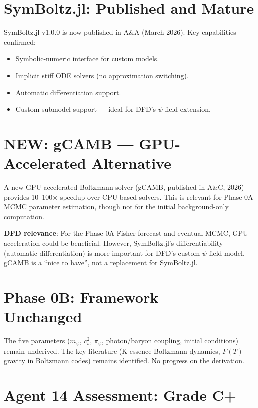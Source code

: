 \documentclass[11pt,a4paper]{article}
\newcommand{\NEW}{\textcolor{dfdblue}{\textbf{NEW}}}
\begin{document}
\section{SymBoltz.jl: Published and Mature}

SymBoltz.jl v1.0.0 is now published in A\&A (March 2026). Key capabilities confirmed:
\begin{itemize}
\item Symbolic-numeric interface for custom models.
\item Implicit stiff ODE solvers (no approximation switching).
\item Automatic differentiation support.
\item Custom submodel support --- ideal for DFD's $\psi$-field extension.
\end{itemize}

\section{\NEW: gCAMB --- GPU-Accelerated Alternative}

\begin{tcolorbox}[colback=blue!5!white, colframe=blue!60!black,
  title={gCAMB (2026): GPU-Accelerated Boltzmann Solver}]

A new GPU-accelerated Boltzmann solver (gCAMB, published in A\&C, 2026) provides 10--100$\times$ speedup over CPU-based solvers. This is relevant for Phase 0A MCMC parameter estimation, though not for the initial background-only computation.

\textbf{DFD relevance}: For the Phase 0A Fisher forecast and eventual MCMC, GPU acceleration could be beneficial. However, SymBoltz.jl's differentiability (automatic differentiation) is more important for DFD's custom $\psi$-field model. gCAMB is a ``nice to have'', not a replacement for SymBoltz.jl.
\end{tcolorbox}

\section{Phase 0B: Framework --- Unchanged}

The five parameters ($m_\psi$, $c_s^2$, $\pi_\psi$, photon/baryon coupling, initial conditions) remain underived. The key literature (K-essence Boltzmann dynamics, $F(T)$ gravity in Boltzmann codes) remains identified. No progress on the derivation.

\section{Agent 14 Assessment: Grade C+}
\end{document}
